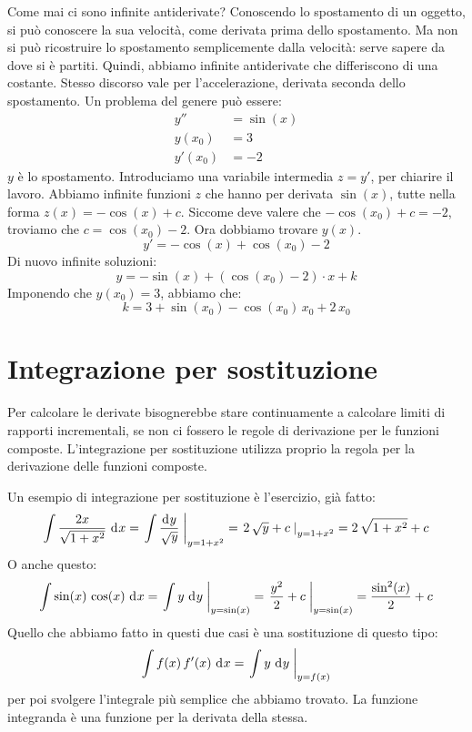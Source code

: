 Come mai ci sono infinite antiderivate? Conoscendo lo spostamento di un oggetto, si pu\`o conoscere la sua velocit\`a, come derivata prima dello spostamento. Ma non si pu\`o ricostruire lo spostamento semplicemente dalla velocit\`a: serve sapere da dove si \`e partiti. Quindi, abbiamo infinite antiderivate che differiscono di una costante. Stesso discorso vale per l'accelerazione, derivata seconda dello spostamento. Un problema del genere pu\`o essere:
\begin{align*}
y'' &= \sin (x) \\
y(x_0) &= 3 \\
y'(x_0) &= -2
\end{align*}
$y$ \`e lo spostamento. Introduciamo una variabile intermedia $z = y'$, per chiarire il lavoro. Abbiamo infinite funzioni $z$ che hanno per derivata $\sin (x)$, tutte nella forma $z(x) = - \cos(x) + c$. Siccome deve valere che $- \cos (x_0) + c = -2$, troviamo che $c = \cos (x_0) - 2$. Ora dobbiamo trovare $y(x)$.
\[
y' = - \cos(x) + \cos (x_0) - 2
\]
Di nuovo infinite soluzioni:
\[
y = - \sin (x) + (\cos (x_0) - 2) \cdot x + k
\]
Imponendo che $y(x_0) = 3$, abbiamo che:
\[
k = 3 + \sin (x_0) - \cos(x_0) \, x_0 + 2 \, x_0
\]

\section{Integrazione per sostituzione}

Per calcolare le derivate bisognerebbe stare continuamente a calcolare limiti di rapporti incrementali, se non ci fossero le regole di derivazione per le funzioni composte. L'integrazione per sostituzione utilizza proprio la regola per la derivazione delle funzioni composte.

Un esempio di integrazione per sostituzione \`e l'esercizio, gi\`a fatto:
\[
\int \frac{2x}{\sqrt{1 + x^2}} \dx = \substitute{\int \frac{\diff y}{\sqrt{y}}}{y = 1 + x^2} = \substitute{2 \, \sqrt{y} + c}{y = 1 + x^2} = 2 \, \sqrt{1 + x^2} + c
\]
O anche questo:
\[
\int \sin(x) \, \cos(x) \dx = \substitute{\int y \dx[y]}{y = \sin (x)} = \substitute{\frac{y^2}{2} + c}{y = \sin (x)} = \frac{\sin^2(x)}{2} + c
\]
Quello che abbiamo fatto in questi due casi \`e una sostituzione di questo tipo:
\[
\int f(x) \, f'(x) \dx = \substitute{\int y \dx[y]}{y = f(x)}
\]
per poi svolgere l'integrale pi\`u semplice che abbiamo trovato. La funzione integranda \`e una funzione per la derivata della stessa.

